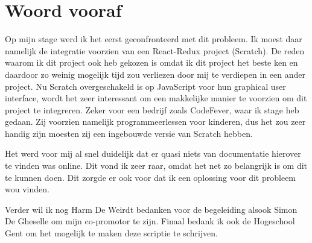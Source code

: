 
\chapter*{Woord vooraf}
\label{ch:voorwoord}


Op mijn stage werd ik het eerst geconfronteerd met dit probleem. Ik moest daar namelijk de integratie voorzien van een React-Redux project (Scratch). De reden waarom ik dit project ook heb gekozen is omdat ik dit project het beste ken en daardoor zo weinig mogelijk tijd zou verliezen door mij te verdiepen in een ander project. Nu Scratch overgeschakeld is op JavaScript voor hun graphical user interface, wordt het zeer interessant om een makkelijke manier te voorzien om dit project te integreren. Zeker voor een bedrijf zoals CodeFever, waar ik stage heb gedaan. Zij voorzien namelijk programmeerlessen voor kinderen, dus het zou zeer handig zijn moesten zij een ingebouwde versie van Scratch hebben. 

Het werd voor mij al snel duidelijk dat er quasi niets van documentatie hierover te vinden was online. Dit vond ik zeer raar, omdat het net zo belangrijk is om dit te kunnen doen. Dit zorgde er ook voor dat ik een oplossing voor dit probleem wou vinden. 

Verder wil ik nog Harm De Weirdt bedanken voor de begeleiding alsook Simon De Gheselle om mijn co-promotor te zijn. Finaal bedank ik ook de Hogeschool Gent om het mogelijk te maken deze scriptie te schrijven.